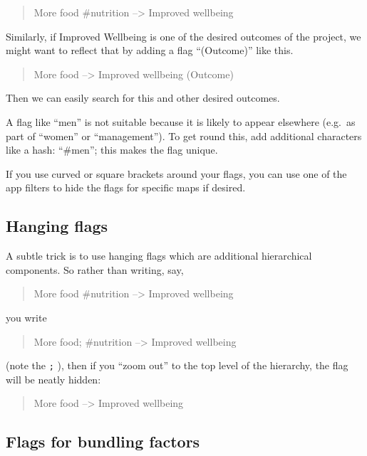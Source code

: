 \documentclass[
]{book}
\begin{document}
\begin{quote}
More food \#nutrition --\textgreater{} Improved wellbeing
\end{quote}

Similarly, if Improved Wellbeing is one of the desired outcomes of the project, we might want to reflect that by adding a flag ``(Outcome)'' like this.

\begin{quote}
More food --\textgreater{} Improved wellbeing (Outcome)
\end{quote}

Then we can easily search for this and other desired outcomes.

A flag like ``men'' is not suitable because it is likely to appear elsewhere (e.g.~as part of ``women'' or ``management''). To get round this, add additional characters like a hash: ``\#men''; this makes the flag unique.

If you use curved or square brackets around your flags, you can use one of the app filters to hide the flags for specific maps if desired.

\hypertarget{xhanging-flags}{%
\subsection{Hanging flags}\label{xhanging-flags}}

A subtle trick is to use hanging flags which are additional hierarchical components. So rather than writing, say,

\begin{quote}
More food \#nutrition --\textgreater{} Improved wellbeing
\end{quote}

you write

\begin{quote}
More food; \#nutrition --\textgreater{} Improved wellbeing
\end{quote}

(note the \texttt{;} ), then if you ``zoom out'' to the top level of the hierarchy, the flag will be neatly hidden:

\begin{quote}
More food --\textgreater{} Improved wellbeing
\end{quote}

\hypertarget{flags-for-bundling-factors}{%
\subsection{Flags for bundling factors}\label{flags-for-bundling-factors}}
\end{document}
